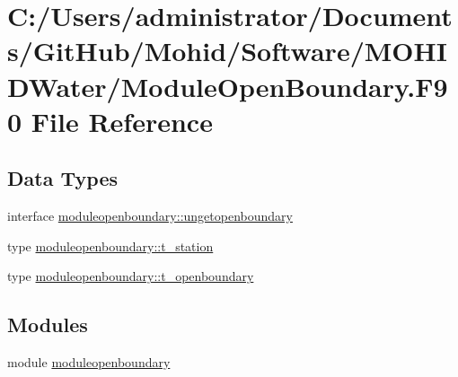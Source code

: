 \hypertarget{_module_open_boundary_8_f90}{}\section{C\+:/\+Users/administrator/\+Documents/\+Git\+Hub/\+Mohid/\+Software/\+M\+O\+H\+I\+D\+Water/\+Module\+Open\+Boundary.F90 File Reference}
\label{_module_open_boundary_8_f90}
\subsection*{Data Types}
\begin{DoxyCompactItemize}
\item 
interface \mbox{\hyperlink{interfacemoduleopenboundary_1_1ungetopenboundary}{moduleopenboundary\+::ungetopenboundary}}
\item 
type \mbox{\hyperlink{structmoduleopenboundary_1_1t__station}{moduleopenboundary\+::t\+\_\+station}}
\item 
type \mbox{\hyperlink{structmoduleopenboundary_1_1t__openboundary}{moduleopenboundary\+::t\+\_\+openboundary}}
\end{DoxyCompactItemize}
\subsection*{Modules}
\begin{DoxyCompactItemize}
\item 
module \mbox{\hyperlink{namespacemoduleopenboundary}{moduleopenboundary}}
\end{DoxyCompactItemize}
